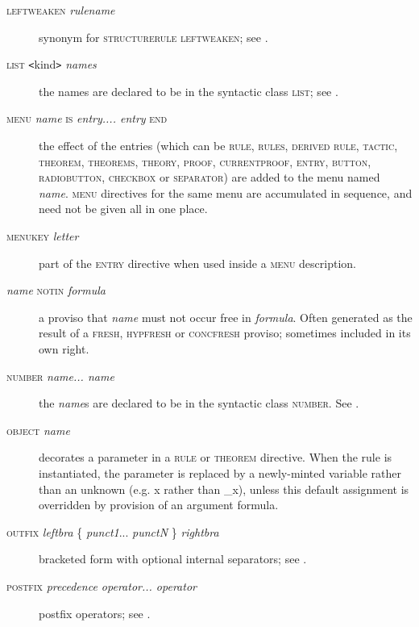 \begin{description}
\item[\textsc{leftweaken} \textit{rulename}] synonym for \textsc{structurerule} \textsc{leftweaken}; see .

\item[\textsc{list \texttt{<}}kind\textsc{\texttt{>}} \textit{names}] the names are declared to be in the syntactic class \textsc{list}; see .

\item[\textsc{menu} \textit{name} \textsc{is} \textit{entry.... entry} \textsc{end}] the effect of the entries (which can be \textsc{rule, rules, derived rule, tactic, theorem, theorems, theory, proof, currentproof, entry, button, radiobutton, checkbox} or \textsc{separator)} are added to the menu named \textit{name}. \textsc{menu} directives for the same menu are accumulated in sequence, and need not be given all in one place.

\item[\textsc{menukey} \textit{letter}] part of the \textsc{entry} directive when used inside a \textsc{menu} description.

\item[\textit{name} \textsc{notin} \textit{formula}] a proviso that \textit{name} must not occur free in \textit{formula}. Often generated as the result of a \textsc{fresh, hypfresh} or \textsc{concfresh} proviso; sometimes included in its own right.

\item[\textsc{number} \textit{name... name}] the \textit{name}s are declared to be in the syntactic class \textsc{number}. See .

\item[\textsc{object} \textit{name}] decorates a parameter in a \textsc{rule} or \textsc{theorem} directive. When the rule is instantiated, the parameter is replaced by a newly-minted variable rather than an unknown (e.g. x rather than \_x), unless this default assignment is overridden by provision of an argument formula.

\item[\textsc{outfix} \textit{leftbra} \{ \textit{punct1}... \textit{punctN} \} \textit{rightbra}] bracketed form with optional internal separators; see .

\item[\textsc{postfix} \textit{precedence operator... operator}] postfix operators; see .


\end{description}
